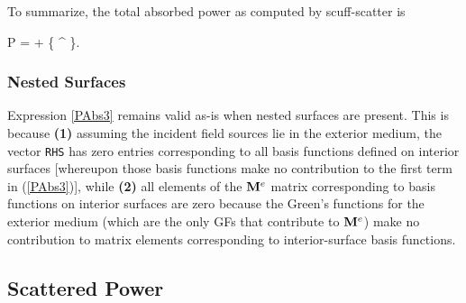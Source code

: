 \documentclass[letterpaper]{article}
\begin{document}
To summarize, the total absorbed power as computed by 
{\sc scuff-scatter} is 

{P = +
   \bigg\{ ^\dagger 
           \cdot 
   \bigg\}.
}

\subsubsection*{Nested Surfaces}

Expression \ref{PAbs3} remains valid as-is when nested
surfaces are present. 
This is because \textbf{(1)} assuming the incident field
sources lie in the exterior medium, the vector \texttt{RHS}
has zero entries corresponding to all basis functions 
defined on interior surfaces [whereupon those basis 
functions make no contribution to the first term in 
(\ref{PAbs3})], while \textbf{(2)} all elements of the $\mathbf{M}^{e}$ 
matrix corresponding to basis functions on interior surfaces
are zero because the Green's functions for the exterior
medium (which are the only GFs that contribute to $\mathbf{M}^{e}$)
make no contribution to matrix elements corresponding to 
interior-surface basis functions. 

\subsection{Scattered Power}
\end{document}
